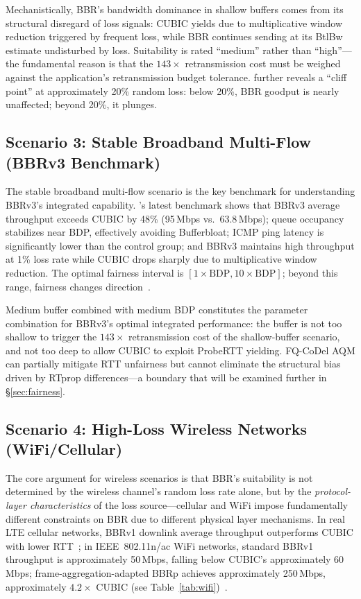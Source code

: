 \documentclass[a4paper,fleqn]{cas-sc}
\begin{document}
Mechanistically, BBR's bandwidth dominance in shallow buffers comes from its
structural disregard of loss signals: CUBIC yields due to multiplicative window
reduction triggered by frequent loss, while BBR continues sending at its BtlBw
estimate undisturbed by loss. Suitability is rated ``medium'' rather than
``high''---the fundamental reason is that the $143\times$ retransmission cost
must be weighed against the application's retransmission budget tolerance.
\citet{cao2019bbr} further reveals a ``cliff point'' at approximately 20\% random
loss: below 20\%, BBR goodput is nearly unaffected; beyond 20\%, it plunges.

\FloatBarrier

\subsection{Scenario 3: Stable Broadband Multi-Flow (BBRv3 Benchmark)}
\label{sec:bbr3}

The stable broadband multi-flow scenario is the key benchmark for understanding
BBRv3's integrated capability. \citet{gomez2024bbrv3}'s latest benchmark shows
that BBRv3 average throughput exceeds CUBIC by 48\% (95\,Mbps vs.\ 63.8\,Mbps);
queue occupancy stabilizes near BDP, effectively avoiding Bufferbloat; ICMP ping
latency is significantly lower than the control group; and BBRv3 maintains high
throughput at 1\% loss rate while CUBIC drops sharply due to multiplicative window
reduction. The optimal fairness interval is $[1\times\text{BDP},10\times\text{BDP}]$;
beyond this range, fairness changes direction~\citep{gomez2024bbrv3}.

Medium buffer combined with medium BDP constitutes the parameter combination for
BBRv3's optimal integrated performance: the buffer is not too shallow to trigger
the $143\times$ retransmission cost of the shallow-buffer scenario, and not too
deep to allow CUBIC to exploit ProbeRTT yielding. FQ-CoDel AQM can partially
mitigate RTT unfairness but cannot eliminate the structural bias driven by RTprop
differences---a boundary that will be examined further in \S\ref{sec:fairness}.

\subsection{Scenario 4: High-Loss Wireless Networks (WiFi/Cellular)}
\label{sec:wireless_loss}

The core argument for wireless scenarios is that BBR's suitability is not
determined by the wireless channel's random loss rate alone, but by the
\emph{protocol-layer characteristics} of the loss source---cellular and WiFi
impose fundamentally different constraints on BBR due to different physical layer
mechanisms. In real LTE cellular networks, BBRv1 downlink average throughput
outperforms CUBIC with lower RTT~\citep{atxutegi2018cellular}; in IEEE~802.11n/ac
WiFi networks, standard BBRv1 throughput is approximately 50\,Mbps, falling below
CUBIC's approximately 60\,Mbps; frame-aggregation-adapted BBRp achieves
approximately 250\,Mbps, approximately $4.2\times$ CUBIC (see
Table~\ref{tab:wifi})~\citep{grazia2020bbrp}.
\end{document}
